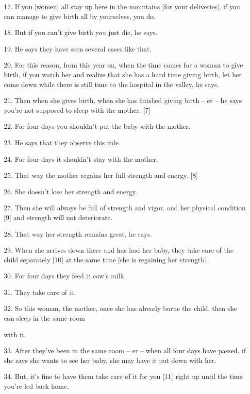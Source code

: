 {\Large{}17. If you [women] all stay up here in the mountains [for your deliveries],
if you can manage to give birth all by yourselves, you do. }

{\Large{}18. But if you can't give birth you just die, he says. }

{\Large{}19. He says they have seen several cases like that. }

{\Large{}20. For this reason, from this year on, when the time comes for a woman
to give birth, if you watch her and realize that she has a hard time giving birth,
let her come down while there is still time to the hospital in the valley, he says.
}

{\Large{}21. Then when she gives birth, when she has finished giving birth -- er
-- he says you're not supposed to sleep with the mother. [7]}

{\Large{}22. For four days you shouldn't put the baby with the mother. }

{\Large{}23. He says that they observe this rule. }

{\Large{}24. For four days it shouldn't stay with the mother. }

{\Large{}25. That way the mother regains her full strength and energy. [8]}

{\Large{}26. She doesn't lose her strength and energy. }

{\Large{}27. Then she will always be full of strength and vigor, and her physical
condition [9] and strength will not deteriorate. }

{\Large{}28. That way her strength remains great, he says. }

{\Large{}29. When she arrives down there and has had her baby, they take care of
the child separately [10] at the same time [she is regaining her strength]. }

{\Large{}30. For four days they feed it cow's milk. }

{\Large{}31. They take care of it. }

{\Large{}32. So this woman, the mother, once she has already borne the child, then
she can sleep in the same room      }

{\Large{}with it.}

{\Large{}33. After they've been in the same room -- er -- when all four days have
passed, if she says she wants to see her baby, she may have it put down with her.
}

{\Large{}34. But, it's fine to have them take care of it for you [11] right up
until the time you're led back home. }

